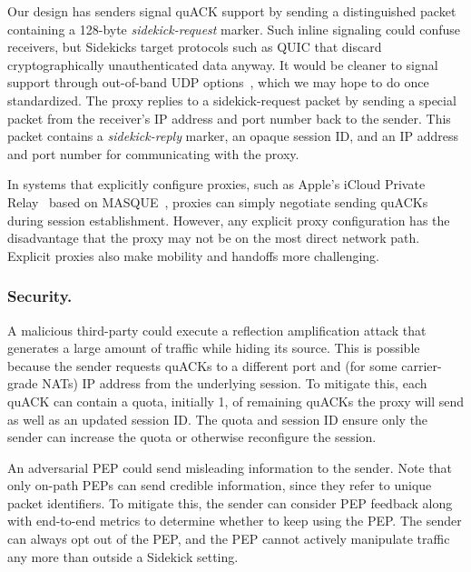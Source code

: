 Our design has senders signal quACK support by sending a
distinguished packet containing a 128-byte \emph{sidekick-request} marker.
Such inline signaling could confuse receivers, but Sidekicks target protocols
such as QUIC that discard cryptographically unauthenticated data anyway.  It
would be cleaner to signal support through out-of-band UDP options~\cite
{ietf-tsvwg-udp-options-28}, which we may hope to do once standardized.
The proxy replies to a sidekick-request packet by sending a special packet from
the receiver's IP address and port number back to the sender. This packet
contains a \emph{sidekick-reply} marker, an opaque session ID, and an IP
address and port number for communicating with the proxy.

In systems that explicitly configure proxies, such as Apple's iCloud Private
Relay~\cite{icloud-private-relay} based on MASQUE~\cite
{kosek2021masque,kramer2021masquepep}, proxies can simply negotiate sending
quACKs during session establishment. However, any explicit proxy configuration
has the disadvantage that the proxy may not be on the most direct network path.
Explicit proxies also make mobility and handoffs more challenging.

\subsubsection{Security.}
A malicious third-party could execute a reflection amplification attack that
generates a large amount of traffic while hiding its source. This is
possible because the sender requests quACKs to a different port and (for some
carrier-grade NATs) IP address from the underlying session. To mitigate this,
each quACK can contain a quota, initially 1, of remaining quACKs the proxy
will send as well as an updated session ID\@.
The quota and session ID ensure only the sender can increase the quota or
otherwise reconfigure the session.

An adversarial PEP could send misleading information to the sender. Note that
only on-path PEPs can send credible information, since they refer to unique
packet identifiers.
To mitigate this, the sender can consider PEP feedback along with
end-to-end metrics to determine whether to keep using the PEP. The sender can
always opt out of the PEP, and the PEP cannot actively manipulate traffic any
more than outside a Sidekick setting.


